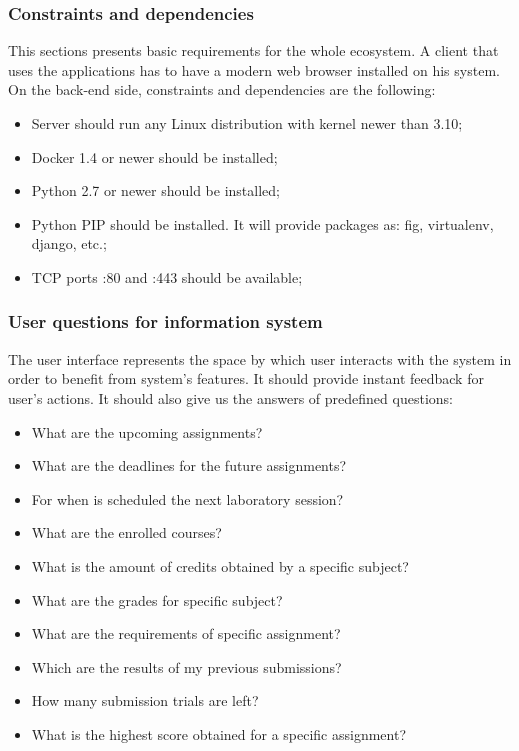 \documentclass[12pt,oneside,a4paper]{article}
\begin{document}
\subsubsection{Constraints and dependencies}
This sections presents basic requirements for the whole ecosystem. A client that uses the applications has to have a modern web browser installed on his system. On the back-end side, constraints and dependencies are the following:
\begin{itemize}
  \item Server should run any Linux distribution with kernel newer than 3.10;
  \item Docker 1.4 or newer should be installed;
  \item Python 2.7 or newer should be installed;
  \item Python PIP should be installed. It will provide packages as: fig, virtualenv, django, etc.;
  \item TCP ports :80 and :443 should be available;
\end{itemize}

\subsubsection{User questions for information system}
The user interface represents the space by which user interacts with the system in order to benefit from system's features. It should provide instant feedback for user's actions. It should also give us the answers of predefined questions:
\begin{itemize}
  \item What are the upcoming assignments?
  \item What are the deadlines for the future assignments?
  \item For when is scheduled the next laboratory session?
  \item What are the enrolled courses?
  \item What is the amount of credits obtained by a specific subject?
  \item What are the grades for specific subject?
  \item What are the requirements of specific assignment?
  \item Which are the results of my previous submissions?
  \item How many submission trials are left?
  \item What is the highest score obtained for a specific assignment?
\end{itemize}
\end{document}
